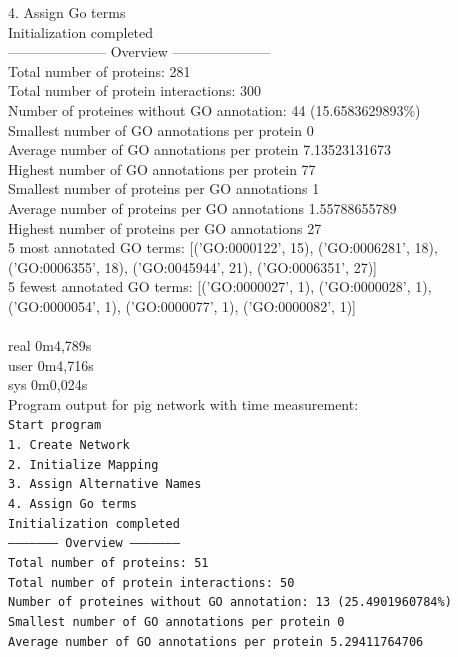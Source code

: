 \documentclass[10pt,a4paper]{article}
\begin{document}
\begin{enumerate}
{4. Assign Go terms\\
Initialization completed\\
--------------------- Overview ---------------------\\
Total number of proteins:			281\\
Total number of protein interactions:		300\\
Number of proteines without GO annotation:	44 (15.6583629893\%)\\
Smallest number of GO annotations per protein	0\\
Average number of GO annotations per protein	7.13523131673\\
Highest number of GO annotations per protein	77\\
Smallest number of proteins per GO annotations	1\\
Average number of proteins per GO annotations	1.55788655789\\
Highest number of proteins per GO annotations	27\\
5 most annotated GO terms:	[('GO:0000122', 15), ('GO:0006281', 18), ('GO:0006355', 18), ('GO:0045944', 21), ('GO:0006351', 27)]\\
5 fewest annotated GO terms:	[('GO:0000027', 1), ('GO:0000028', 1), ('GO:0000054', 1), ('GO:0000077', 1), ('GO:0000082', 1)]\\
\\
real	0m4,789s\\
user	0m4,716s\\
sys	0m0,024s\\
}
\newpage
Program output for pig network with time measurement:\\
\texttt{Start program\\
1. Create Network\\
2. Initialize Mapping\\
3. Assign Alternative Names\\
4. Assign Go terms\\
Initialization completed\\
--------------------- Overview ---------------------\\
Total number of proteins:			51\\
Total number of protein interactions:		50\\
Number of proteines without GO annotation:	13 (25.4901960784\%)\\
Smallest number of GO annotations per protein	0\\
Average number of GO annotations per protein	5.29411764706\\
}
\end{enumerate}
\end{document}
